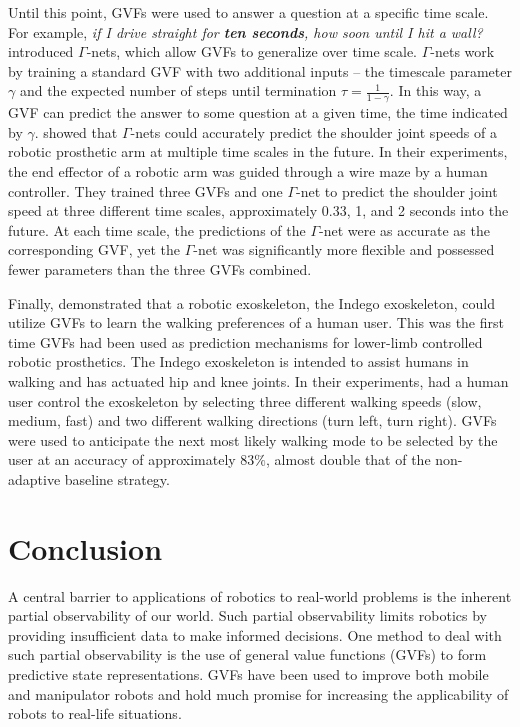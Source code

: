 \documentclass{article} %
\theoremstyle{plain}
\theoremstyle{definition}
\theoremstyle{remark}
\begin{document}
Until this point, GVFs were used to answer a question at a specific time scale. For example, \textit{if I drive
straight for \textbf{ten seconds}, how soon until I hit a wall?} \cite{sherstand2019gamma} introduced $\Gamma$-nets,
which allow GVFs to generalize over time scale. $\Gamma$-nets work by training a standard GVF with two additional inputs
-- the timescale parameter $\gamma$ and the expected number of steps until termination $\tau = \frac{1}{1 - \gamma}$. In
this way, a GVF can predict the answer to some question at a given time, the time indicated by $\gamma$.
\cite{sherstand2019gamma} showed that $\Gamma$-nets could accurately predict the shoulder joint speeds of a robotic
prosthetic arm at multiple time scales in the future. In their experiments, the end effector of a robotic arm was guided
through a wire maze by a human controller. They trained three GVFs and one $\Gamma$-net to predict the shoulder joint
speed at three different time scales, approximately 0.33, 1, and 2 seconds into the future. At each time scale, the
predictions of the $\Gamma$-net were as accurate as the corresponding GVF, yet the $\Gamma$-net was significantly more
flexible and possessed fewer parameters than the three GVFs combined.

Finally, \cite{fardi2020machine} demonstrated that a robotic exoskeleton, the Indego exoskeleton, could utilize GVFs to
learn the walking preferences of a human user. This was the first time GVFs had been used as prediction mechanisms for
lower-limb controlled robotic prosthetics. The Indego exoskeleton is intended to assist humans in walking and has
actuated hip and knee joints. In their experiments, \cite{fardi2020machine} had a human user control the exoskeleton by
selecting three different walking speeds (slow, medium, fast) and two different walking directions (turn left, turn
right). GVFs were used to anticipate the next most likely walking mode to be selected by the user at an accuracy of
approximately $83\%$, almost double that of the non-adaptive baseline strategy.

\section{Conclusion}%
\label{sec:conclusion}

A central barrier to applications of robotics to real-world problems is the inherent partial observability of our world.
Such partial observability limits robotics by providing insufficient data to make informed decisions. One method to deal
with such partial observability is the use of general value functions (GVFs) to form predictive state representations.
GVFs have been used to improve both mobile and manipulator robots and hold much promise for increasing the applicability
of robots to real-life situations.
\end{document}

